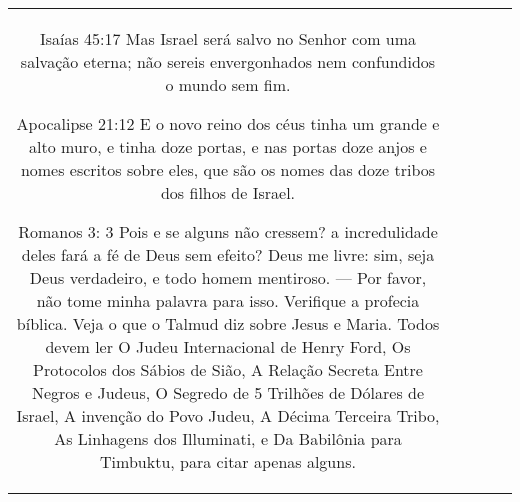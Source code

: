 \documentclass[11pt]{article}
\newlength\mylength
\begin{document}
\begin{center}
\begin{longtable}{|C{.65\mylength}|C{.30\mylength}|C{.12\mylength}|C{.12\mylength}|C{.12\mylength}|}
Isaías 45:17 Mas Israel será salvo no Senhor com uma salvação eterna; não sereis envergonhados nem confundidos o mundo sem fim.

Apocalipse 21:12 E o novo reino dos céus tinha um grande e alto muro, e tinha doze portas, e nas portas doze anjos e nomes escritos sobre eles, que são os nomes das doze tribos dos filhos de Israel.

Romanos 3: 3 Pois e se alguns não cressem? a incredulidade deles fará a fé de Deus sem efeito? Deus me livre: sim, seja Deus verdadeiro, e todo homem mentiroso.
---
Por favor, não tome minha palavra para isso. Verifique a profecia bíblica. Veja o que o Talmud diz sobre Jesus e Maria. Todos devem ler O Judeu Internacional de Henry Ford, Os Protocolos dos Sábios de Sião, A Relação Secreta Entre Negros e Judeus, O Segredo de 5 Trilhões de Dólares de Israel, A invenção do Povo Judeu, A Décima Terceira Tribo, As Linhagens dos Illuminati, e Da Babilônia para Timbuktu, para citar apenas alguns.


\end{longtable}
\end{center}
\end{document}
